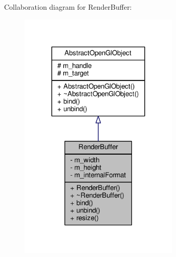 Collaboration diagram for Render\-Buffer\-:\nopagebreak
\begin{figure}[H]
\begin{center}
\leavevmode
\includegraphics[width=216pt]{class_render_buffer__coll__graph}
\end{center}
\end{figure}
